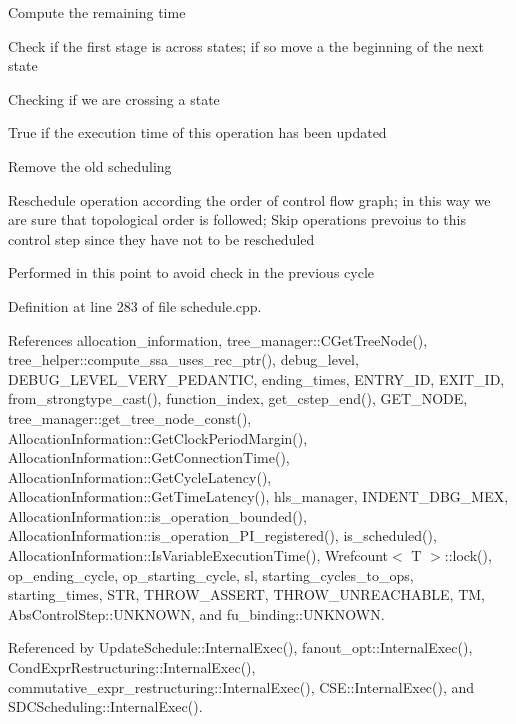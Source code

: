 Compute the remaining time

Check if the first stage is across states; if so move a the beginning of the next state

Checking if we are crossing a state

True if the execution time of this operation has been updated

Remove the old scheduling

Reschedule operation according the order of control flow graph; in this way we are sure that topological order is followed; Skip operations prevoius to this control step since they have not to be rescheduled

Performed in this point to avoid check in the previous cycle 

Definition at line 283 of file schedule.\+cpp.



References allocation\+\_\+information, tree\+\_\+manager\+::\+C\+Get\+Tree\+Node(), tree\+\_\+helper\+::compute\+\_\+ssa\+\_\+uses\+\_\+rec\+\_\+ptr(), debug\+\_\+level, D\+E\+B\+U\+G\+\_\+\+L\+E\+V\+E\+L\+\_\+\+V\+E\+R\+Y\+\_\+\+P\+E\+D\+A\+N\+T\+IC, ending\+\_\+times, E\+N\+T\+R\+Y\+\_\+\+ID, E\+X\+I\+T\+\_\+\+ID, from\+\_\+strongtype\+\_\+cast(), function\+\_\+index, get\+\_\+cstep\+\_\+end(), G\+E\+T\+\_\+\+N\+O\+DE, tree\+\_\+manager\+::get\+\_\+tree\+\_\+node\+\_\+const(), Allocation\+Information\+::\+Get\+Clock\+Period\+Margin(), Allocation\+Information\+::\+Get\+Connection\+Time(), Allocation\+Information\+::\+Get\+Cycle\+Latency(), Allocation\+Information\+::\+Get\+Time\+Latency(), hls\+\_\+manager, I\+N\+D\+E\+N\+T\+\_\+\+D\+B\+G\+\_\+\+M\+EX, Allocation\+Information\+::is\+\_\+operation\+\_\+bounded(), Allocation\+Information\+::is\+\_\+operation\+\_\+\+P\+I\+\_\+registered(), is\+\_\+scheduled(), Allocation\+Information\+::\+Is\+Variable\+Execution\+Time(), Wrefcount$<$ T $>$\+::lock(), op\+\_\+ending\+\_\+cycle, op\+\_\+starting\+\_\+cycle, sl, starting\+\_\+cycles\+\_\+to\+\_\+ops, starting\+\_\+times, S\+TR, T\+H\+R\+O\+W\+\_\+\+A\+S\+S\+E\+RT, T\+H\+R\+O\+W\+\_\+\+U\+N\+R\+E\+A\+C\+H\+A\+B\+LE, TM, Abs\+Control\+Step\+::\+U\+N\+K\+N\+O\+WN, and fu\+\_\+binding\+::\+U\+N\+K\+N\+O\+WN.



Referenced by Update\+Schedule\+::\+Internal\+Exec(), fanout\+\_\+opt\+::\+Internal\+Exec(), Cond\+Expr\+Restructuring\+::\+Internal\+Exec(), commutative\+\_\+expr\+\_\+restructuring\+::\+Internal\+Exec(), C\+S\+E\+::\+Internal\+Exec(), and S\+D\+C\+Scheduling\+::\+Internal\+Exec().

